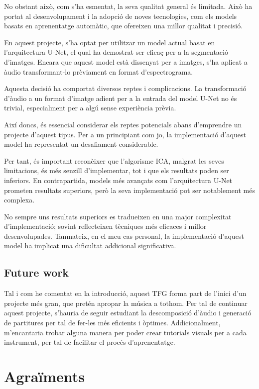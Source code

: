 \documentclass[10pt,a4paper,twocolumn,twoside]{article}
\begin{document}
No obstant això, com s'ha esmentat, la seva qualitat general és limitada. Això ha portat al desenvolupament i la adopció de noves tecnologies, com els models basats en aprenentatge automàtic, que ofereixen una millor qualitat i precisió.

En aquest projecte, s'ha optat per utilitzar un model actual basat en l'arquitectura U-Net, el qual ha demostrat ser eficaç per a la segmentació d'imatges. Encara que aquest model està dissenyat per a imatges, s'ha aplicat a àudio transformant-lo prèviament en format d'espectrograma.

Aquesta decisió ha comportat diversos reptes i complicacions. La transformació d'àudio a un format d'imatge adient per a la entrada del model U-Net no és trivial, especialment per a algú sense experiència prèvia.

Així doncs, és essencial considerar els reptes potencials abans d'emprendre un projecte d'aquest tipus. Per a un principiant com jo, la implementació d'aquest model ha representat un desafiament considerable.

Per tant, és important reconèixer que l'algorisme ICA, malgrat les seves limitacions, és més senzill d'implementar, tot i que els resultats poden ser inferiors. En contrapartida, models més avançats com l'arquitectura U-Net prometen resultats superiors, però la seva implementació pot ser notablement més complexa.

No sempre uns resultats superiors es tradueixen en una major complexitat d'implementació; sovint reflecteixen tècniques més eficaces i millor desenvolupades. Tanmateix, en el meu cas personal, la implementació d'aquest model ha implicat una dificultat addicional significativa.

\subsection{Future work}

Tal i com he comentat en la introducció, aquest TFG forma part de l'inici d'un projecte més gran, que pretén apropar la música a tothom.
Per tal de continuar aquest projecte, s'hauria de seguir estudiant la descomposició d'àudio i generació de partitures per tal de fer-les més eficients i òptimes. Addicionalment, m'encantaria trobar alguna manera per poder crear tutorials visuals per a cada instrument, per tal de facilitar el procés d'aprenentatge.

\section*{Agraïments}
\end{document}

